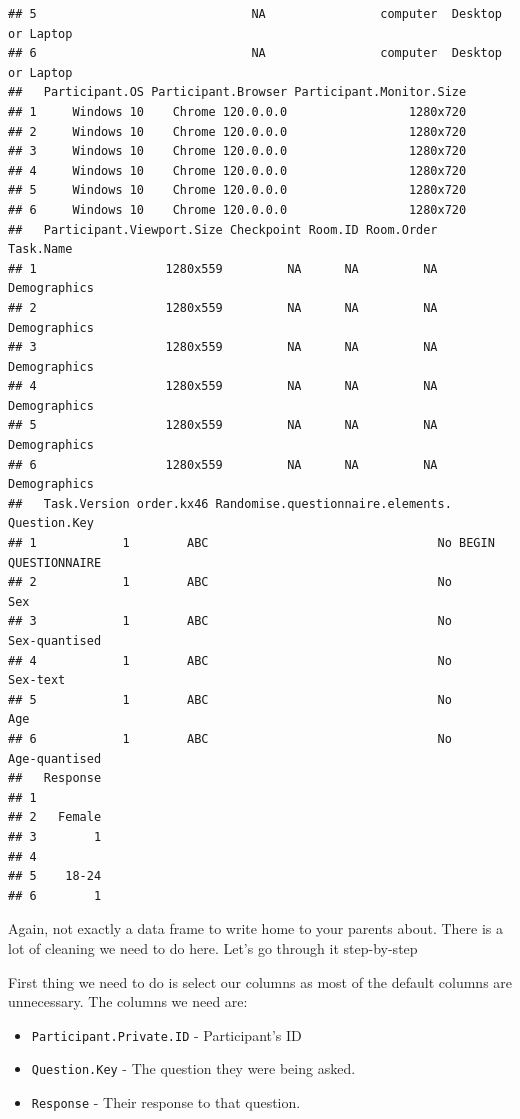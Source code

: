 \documentclass[
]{book}
\providecommand{\tightlist}{%
  \setlength{\itemsep}{0pt}\setlength{\parskip}{0pt}}
\begin{document}
\begin{verbatim}
## 5                              NA                computer  Desktop or Laptop
## 6                              NA                computer  Desktop or Laptop
##   Participant.OS Participant.Browser Participant.Monitor.Size
## 1     Windows 10    Chrome 120.0.0.0                 1280x720
## 2     Windows 10    Chrome 120.0.0.0                 1280x720
## 3     Windows 10    Chrome 120.0.0.0                 1280x720
## 4     Windows 10    Chrome 120.0.0.0                 1280x720
## 5     Windows 10    Chrome 120.0.0.0                 1280x720
## 6     Windows 10    Chrome 120.0.0.0                 1280x720
##   Participant.Viewport.Size Checkpoint Room.ID Room.Order    Task.Name
## 1                  1280x559         NA      NA         NA Demographics
## 2                  1280x559         NA      NA         NA Demographics
## 3                  1280x559         NA      NA         NA Demographics
## 4                  1280x559         NA      NA         NA Demographics
## 5                  1280x559         NA      NA         NA Demographics
## 6                  1280x559         NA      NA         NA Demographics
##   Task.Version order.kx46 Randomise.questionnaire.elements.        Question.Key
## 1            1        ABC                                No BEGIN QUESTIONNAIRE
## 2            1        ABC                                No                 Sex
## 3            1        ABC                                No       Sex-quantised
## 4            1        ABC                                No            Sex-text
## 5            1        ABC                                No                 Age
## 6            1        ABC                                No       Age-quantised
##   Response
## 1         
## 2   Female
## 3        1
## 4         
## 5    18-24
## 6        1
\end{verbatim}

Again, not exactly a data frame to write home to your parents about. There is a lot of cleaning we need to do here. Let's go through it step-by-step

First thing we need to do is select our columns as most of the default columns are unnecessary. The columns we need are:

\begin{itemize}
\tightlist
\item
  \texttt{Participant.Private.ID} - Participant's ID
\item
  \texttt{Question.Key} - The question they were being asked.
\item
  \texttt{Response} - Their response to that question.
\end{itemize}
\end{document}
